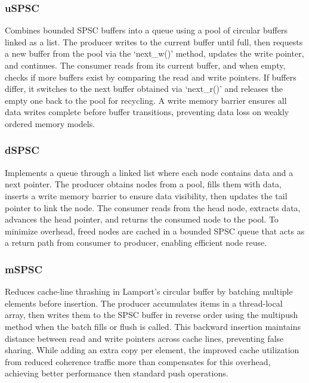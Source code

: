 \subsubsection{\ac{uSPSC}}
Combines bounded SPSC buffers into a queue using a pool of circular buffers linked as a list. The producer writes to the current buffer until full, then requests a new buffer from the pool via the \enquote*{next\_w()} method, updates the write pointer, and continues. The consumer reads from its current buffer, and when empty, checks if more buffers exist by comparing the read and write pointers. If buffers differ, it switches to the next buffer obtained via \enquote*{next\_r()} and releases the empty one back to the pool for recycling. A write memory barrier ensures all data writes complete before buffer transitions, preventing data loss on weakly ordered memory models. \cite{torquati2010singleproducersingleconsumerqueuessharedcache,Aldinucci2012EfficientSync}

\subsubsection{\ac{dSPSC}}
Implements a queue through a linked list where each node contains data and a next pointer. The producer obtains nodes from a pool, fills them with data, inserts a write memory barrier to ensure data visibility, then updates the tail pointer to link the node. The consumer reads from the head node, extracts data, advances the head pointer, and returns the consumed node to the pool. To minimize overhead, freed nodes are cached in a bounded SPSC queue that acts as a return path from consumer to producer, enabling efficient node reuse. \cite{torquati2010singleproducersingleconsumerqueuessharedcache,Aldinucci2012EfficientSync}

\subsubsection{\ac{mSPSC}}
Reduces cache-line thrashing in Lamport's circular buffer by batching multiple elements before insertion. The producer accumulates items in a thread-local array, then writes them to the SPSC buffer in reverse order using the multipush method when the batch fills or flush is called. This backward insertion maintains distance between read and write pointers across cache lines, preventing false sharing. While adding an extra copy per element, the improved cache utilization from reduced coherence traffic more than compensates for this overhead, achieving better performance then standard push operations. \cite{torquati2010singleproducersingleconsumerqueuessharedcache}

